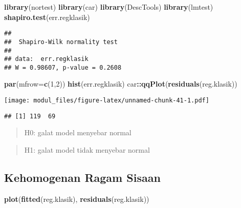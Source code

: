 \documentclass[
]{book}
\newenvironment{Shaded}{\begin{snugshade}}{\end{snugshade}}
\newcommand{\DataTypeTok}[1]{\textcolor[rgb]{0.13,0.29,0.53}{#1}}
\newcommand{\DecValTok}[1]{\textcolor[rgb]{0.00,0.00,0.81}{#1}}
\newcommand{\KeywordTok}[1]{\textcolor[rgb]{0.13,0.29,0.53}{\textbf{#1}}}
\newcommand{\NormalTok}[1]{#1}
\newcommand{\OperatorTok}[1]{\textcolor[rgb]{0.81,0.36,0.00}{\textbf{#1}}}
\begin{document}
\begin{Shaded}
\begin{Highlighting}[]
\KeywordTok{library}\NormalTok{(nortest)}
\KeywordTok{library}\NormalTok{(car)}
\KeywordTok{library}\NormalTok{(DescTools)}
\KeywordTok{library}\NormalTok{(lmtest)}
\KeywordTok{shapiro.test}\NormalTok{(err.regklasik)}
\end{Highlighting}
\end{Shaded}

\begin{verbatim}
## 
##  Shapiro-Wilk normality test
## 
## data:  err.regklasik
## W = 0.98607, p-value = 0.2608
\end{verbatim}

\begin{Shaded}
\begin{Highlighting}[]
\KeywordTok{par}\NormalTok{(}\DataTypeTok{mfrow=}\KeywordTok{c}\NormalTok{(}\DecValTok{1}\NormalTok{,}\DecValTok{2}\NormalTok{))}
\KeywordTok{hist}\NormalTok{(err.regklasik)}
\NormalTok{car}\OperatorTok{::}\KeywordTok{qqPlot}\NormalTok{(}\KeywordTok{residuals}\NormalTok{(reg.klasik))}
\end{Highlighting}
\end{Shaded}

\texttt{[image: modul\_files/figure-latex/unnamed-chunk-41-1.pdf]}

\begin{verbatim}
## [1] 119  69
\end{verbatim}

\begin{quote}
H0: galat model menyebar normal
\end{quote}

\begin{quote}
H1: galat model tidak menyebar normal
\end{quote}

\hypertarget{kehomogenan-ragam-sisaan}{%
\subsection{Kehomogenan Ragam Sisaan}\label{kehomogenan-ragam-sisaan}}

\begin{Shaded}
\begin{Highlighting}[]
\KeywordTok{plot}\NormalTok{(}\KeywordTok{fitted}\NormalTok{(reg.klasik), }\KeywordTok{residuals}\NormalTok{(reg.klasik))}
\end{Highlighting}
\end{Shaded}
\end{document}
